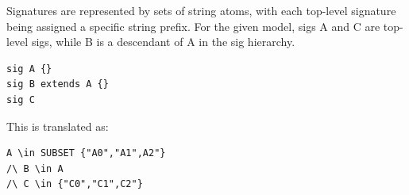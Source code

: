 Signatures are represented by sets of string atoms, with each top-level signature being assigned a specific string prefix. For the given model, sigs A and C are top-level sigs, while B is a descendant of A in the sig hierarchy.

\begin{lstlisting}
sig A {}
sig B extends A {}
sig C
\end{lstlisting}

This is translated as:

\begin{lstlisting}
A \in SUBSET {"A0","A1",A2"}
/\ B \in A
/\ C \in {"C0","C1",C2"}
\end{lstlisting}


